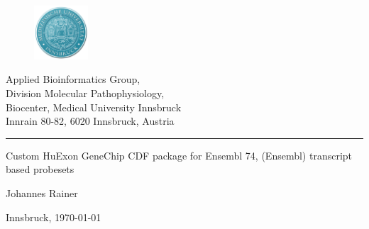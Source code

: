 \documentclass[a4paper,10pt,american]{report}
\begin{document}
\begin{titlepage}

 \begin{center}
   \parbox[t]{9cm}{
     \begin{figure}
        \includegraphics[width=2cm]{./images/MUIlogo-2.png}
      \end{figure}
      \parbox[t]{7.8cm}{
      \vspace{0.4cm}
      \raggedright
      \normalsize
      Applied Bioinformatics Group,\\
      Division Molecular Pathophysiology,\\
      Biocenter, Medical University Innsbruck\\
      Innrain 80-82, 6020 Innsbruck, Austria\\
      \noindent\rule[1ex]{\linewidth}{1pt}
      }
    }
  \end{center}
\vspace{6.5cm}
    \begin{center}
     \Large
     Custom HuExon GeneChip CDF package for Ensembl 74, (Ensembl) transcript based
     probesets
    \end{center}

\vspace{1.5cm}

    \begin{center}
     \large
     Johannes Rainer
    \end{center}

\vspace{7.5cm}
   \vfill
   \begin{center}
     \normalsize
     Innsbruck, \today \\
   \end{center}
\end{titlepage}



\pagebreak

  \pagebreak

  \setcounter{secnumdepth}{0}

  \setcounter{secnumdepth}{3}

  \setcounter{page}{1}

  
\end{document}
